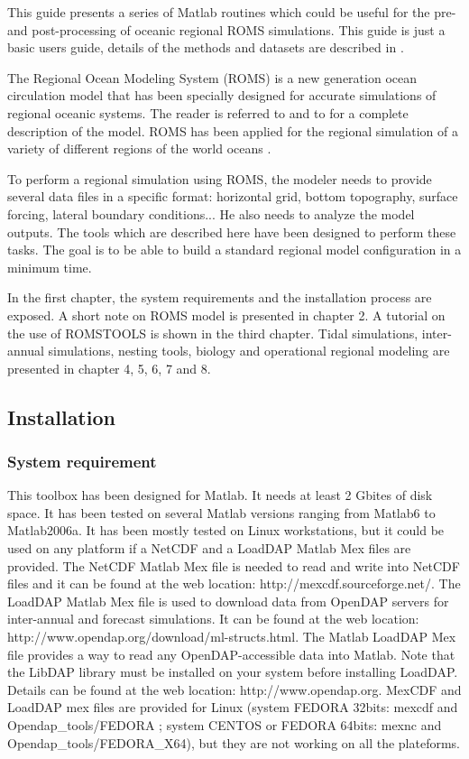 This guide presents a series of Matlab routines which
could be useful for the pre- and post-processing of oceanic
regional ROMS simulations. This guide is just a basic 
users guide, details of the methods and datasets are
described in \citet{Pen07}.

The Regional Ocean Modeling System (ROMS) is a new
generation ocean circulation model \citep{Shc03b}
that has been specially designed for accurate simulations
of regional oceanic systems.
The reader is referred to \citet{Shc03a} and to 
\citet{Shc03b} for a complete description of the model.
ROMS has been applied for the regional simulation of a 
variety of different regions of the world oceans 
\citep[e.g.][]{Bla02,Dil03,Hai00,Mac02,Mar03,Pen01}.

To perform a regional simulation using ROMS, the modeler 
needs to provide several data files in a specific format:
horizontal grid, bottom topography, surface forcing,
lateral boundary conditions... He also needs to analyze
the model outputs. The tools which are described here
have been designed to perform these tasks.
The goal is to be able to build a standard
regional model configuration in a minimum time. 

In the first chapter, the system requirements and the 
installation process are exposed. A short  note on ROMS 
model is presented in chapter 2. A tutorial on the use of
ROMSTOOLS is shown in the third chapter. Tidal simulations, 
inter-annual simulations, nesting tools, biology and
operational regional modeling are presented  in chapter 4, 
5, 6, 7 and 8.

\subsection{Installation}

\subsubsection{System requirement}

This toolbox has been designed for Matlab. It needs at least 
2 Gbites of disk space. It has been tested on several 
Matlab versions ranging from Matlab6 to Matlab2006a. It has been 
mostly tested on Linux workstations, but it could be used 
on any platform if a NetCDF and a LoadDAP  Matlab Mex files  
are provided. The NetCDF Matlab Mex file is needed to read 
and write into NetCDF files and it can be found at the web 
location: http://mexcdf.sourceforge.net/. The LoadDAP Matlab Mex file
is used to download data from OpenDAP servers for inter-annual and forecast 
simulations. It can be found at the web location: 
http://www.opendap.org/download/ml-structs.html. The Matlab 
LoadDAP Mex file provides a way to read any OpenDAP-accessible 
data into Matlab. Note that the LibDAP library must be installed
on your system before installing LoadDAP. Details can be found 
at the web location: http://www.opendap.org. MexCDF and LoadDAP mex 
files are provided for Linux (system FEDORA 32bits: mexcdf and 
Opendap\_tools/FEDORA ; system CENTOS or FEDORA 64bits: 
mexnc and Opendap\_tools/FEDORA\_X64), but they are not working 
on all the plateforms.


